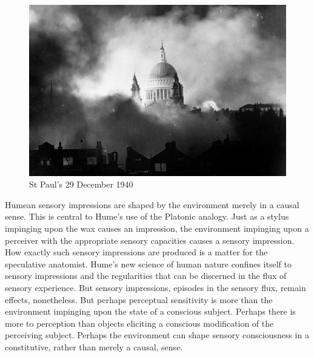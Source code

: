 \begin{figure}[htbp]
	\centering
		\includegraphics[scale=0.6]{graphics/stpauls.jpg}
	\caption{St Paul's 29 December 1940}
	\label{fig:stpauls}
\end{figure}

Humean sensory impressions are shaped by the environment merely in a causal sense. This is central to Hume's use of the Platonic analogy. Just as a stylus impinging upon the wax causes an impression, the environment impinging upon a perceiver with the appropriate sensory capacities causes a sensory impression. How exactly such sensory impressions are produced is a matter for the speculative a\-na\-to\-mist. Hume's new science of human nature confines itself to sensory impressions and the regularities that can be discerned in the flux of sensory experience. But sensory impressions, episodes in the sensory flux, remain effects, nonetheless. But perhaps perceptual sensitivity is more than the environment impinging upon the state of a conscious subject. Perhaps there is more to perception than objects eliciting a conscious modification of the perceiving subject. Perhaps the environment can shape sensory consciousness in a constitutive, rather than merely a causal, sense.

